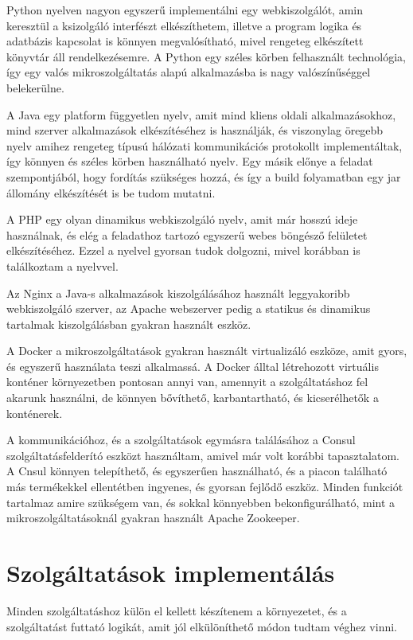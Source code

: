 \documentclass[11pt,magyar,a4paper,twoside,]{report}
\begin{document}
Python nyelven nagyon egyszerű implementálni egy webkiszolgálót, amin
keresztül a ksizolgáló interfészt elkészíthetem, illetve a program
logika és adatbázis kapcsolat is könnyen megvalósítható, mivel rengeteg
elkészített könyvtár áll rendelkezésemre. A Python egy széles körben
felhasznált technológia, így egy valós mikroszolgáltatás alapú
alkalmazásba is nagy valószínűséggel belekerülne.

A Java egy platform függyetlen nyelv, amit mind kliens oldali
alkalmazásokhoz, mind szerver alkalmazások elkészítéséhez is használják,
és viszonylag öregebb nyelv amihez rengeteg típusú hálózati
kommunikációs protokollt implementáltak, így könnyen és széles körben
használható nyelv. Egy másik előnye a feladat szempontjából, hogy
fordítás szükséges hozzá, és így a build folyamatban egy jar állomány
elkészítését is be tudom mutatni.

A PHP egy olyan dinamikus webkiszolgáló nyelv, amit már hosszú ideje
használnak, és elég a feladathoz tartozó egyszerű webes böngésző
felületet elkészítéséhez. Ezzel a nyelvel gyorsan tudok dolgozni, mivel
korábban is találkoztam a nyelvvel.

Az Nginx a Java-s alkalmazások kiszolgálásához használt leggyakoribb
webkiszolgáló szerver, az Apache webszerver pedig a statikus és
dinamikus tartalmak kiszolgálásban gyakran használt eszköz.

A Docker a mikroszolgáltatások gyakran használt virtualizáló eszköze,
amit gyors, és egyszerű használata teszi alkalmassá. A Docker álltal
létrehozott virtuális konténer környezetben pontosan annyi van, amennyit
a szolgáltatáshoz fel akarunk használni, de könnyen bővíthető,
karbantartható, és kicserélhetők a konténerek.

A kommunikációhoz, és a szolgáltatások egymásra találásához a Consul
szolgáltatásfelderító eszközt használtam, amivel már volt korábbi
tapasztalatom. A Cnsul könnyen telepíthető, és egyszerűen használható,
és a piacon található más termékekkel ellentétben ingyenes, és gyorsan
fejlődő eszköz. Minden funkciót tartalmaz amire szükségem van, és sokkal
könnyebben bekonfigurálható, mint a mikroszolgáltatásoknál gyakran
használt Apache Zookeeper.

\section{Szolgáltatások
implementálás}\label{szolguxe1ltatuxe1sok-implementuxe1luxe1s}

Minden szolgáltatáshoz külön el kellett készítenem a környezetet, és a
szolgáltatást futtató logikát, amit jól elkülöníthető módon tudtam
véghez vinni.
\end{document}
